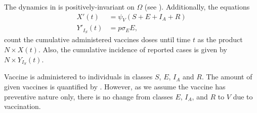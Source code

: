 The dynamics in  is positively-invariant on $\Omega$ 
(see ). Additionally, the equations
\begin{equation}
    \label{eqn:model1_counters}
    \begin{aligned}
        X'(t) &=
        \psi_V(S + E + I_A + R)
        \\
        Y'_{I_S}(t) &=p
        \sigma_E E,
    \end{aligned}
\end{equation}
%
count the cumulative administered vaccines doses until time $t$ as the product 
$N\times X(t)$.
Also, the cumulative incidence of reported cases is given by 
$N\times Y_{I_S}(t)$.
\begin{rmk}
    Vaccine is administered to individuals in classes $S$, $E$, $I_A$ and $R$. 
    The amount of given vaccines is quantified by . 
    However, as we 
    assume the vaccine has preventive nature only, there is no change from 
    classes $E$, $I_A$, and 
    $R$ to $V$ due to vaccination. 
\end{rmk}

